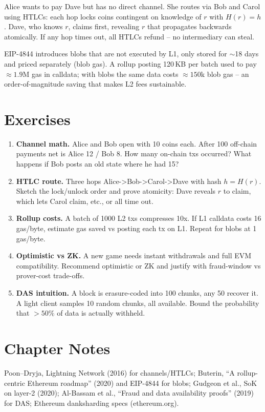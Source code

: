 \begin{example}\label{ex:lightning-route}
Alice wants to pay Dave but has no direct channel. She routes via Bob and Carol using HTLCs: each hop locks coins contingent on knowledge of $r$ with $H(r)=h$. Dave, who knows $r$, claims first, revealing $r$ that propagates backwards atomically. If any hop times out, all HTLCs refund -- no intermediary can steal.
\end{example}

\begin{example}\label{ex:blob}
EIP-4844 introduces blobs that are not executed by L1, only stored for $\sim$18 days and priced separately (blob gas). A rollup posting 120\,KB per batch used to pay $\approx1.9$M gas in calldata; with blobs the same data costs $\approx150$k blob gas -- an order-of-magnitude saving that makes L2 fees sustainable.
\end{example}

\section{Exercises}\label{sec:ch06-exercises}
\begin{enumerate}[label=E6.\arabic*, leftmargin=*, itemsep=0.6em]
    \item \textbf{Channel math.} Alice and Bob open with 10 coins each. After 100 off-chain payments net is Alice 12 / Bob 8. How many on-chain txs occurred? What happens if Bob posts an old state where he had 15?
    \item \textbf{HTLC route.} Three hops Alice->Bob->Carol->Dave with hash $h=H(r)$. Sketch the lock/unlock order and prove atomicity: Dave reveals $r$ to claim, which lets Carol claim, etc., or all time out.
    \item \textbf{Rollup costs.} A batch of 1000 L2 txs compresses 10x. If L1 calldata costs 16 gas/byte, estimate gas saved vs posting each tx on L1. Repeat for blobs at 1 gas/byte.
    \item \textbf{Optimistic vs ZK.} A new game needs instant withdrawals and full EVM compatibility. Recommend optimistic or ZK and justify with fraud-window vs prover-cost trade-offs.
    \item \textbf{DAS intuition.} A block is erasure-coded into 100 chunks, any 50 recover it. A light client samples 10 random chunks, all available. Bound the probability that $>50\%$ of data is actually withheld.
\end{enumerate}

\section*{Chapter Notes}
Poon--Dryja, Lightning Network (2016) for channels/HTLCs; Buterin, ``A rollup-centric Ethereum roadmap'' (2020) and EIP-4844 for blobs; Gudgeon et al., SoK on layer-2 (2020); Al-Bassam et al., ``Fraud and data availability proofs'' (2019) for DAS; Ethereum danksharding specs (ethereum.org).
